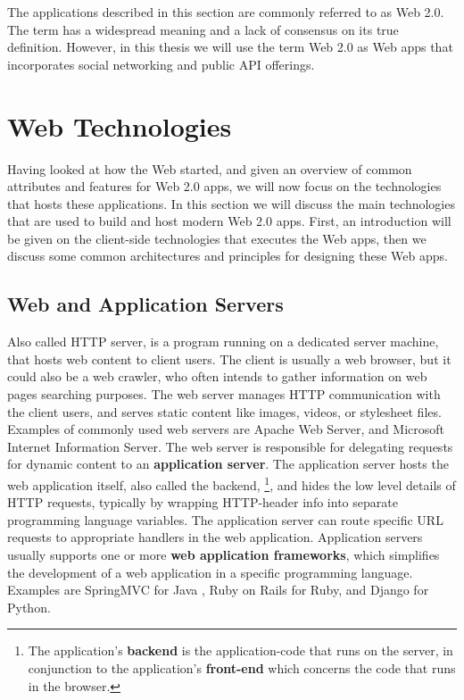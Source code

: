 The applications described in this section are commonly referred to as Web 2.0. \cite{web2.0} The term has a widespread meaning and a lack of consensus on its true definition. However, in this thesis we will use the term Web 2.0 as Web apps that incorporates social networking and public API offerings.

\section{Web Technologies}
Having looked at how the Web started, and given an overview of common attributes and features for Web 2.0 apps, we will now focus on the technologies that hosts these applications. In this section we will discuss the main technologies that are used to build and host modern Web 2.0 apps. First, an introduction will be given on the client-side technologies that executes the Web apps, then we discuss some common architectures and principles for designing these Web apps.

\subsection{Web and Application Servers}
Also called HTTP server, is a program running on a dedicated server machine, that hosts web content to client users. The client is usually a web browser, but it could also be a web crawler, who often intends to gather information on web pages searching purposes. The web server manages  HTTP communication with the client users, and serves static content like images, videos, or stylesheet files. Examples of commonly used web servers are Apache Web Server,\cite{apache} and Microsoft Internet Information Server.\cite{iis} The web server is responsible for delegating requests for dynamic content to an \textbf{application server}. The application server hosts the web application itself, also called the backend, \footnote{The application's \textbf{backend} is the application-code that runs on the server, in conjunction to the application's \textbf{front-end} which concerns the code that runs in the browser.}, and hides the low level details of HTTP requests, typically by wrapping HTTP-header info into separate programming language variables. The application server can route specific URL requests to appropriate handlers in the web application.  Application servers usually supports one or more \textbf{web application frameworks}, which simplifies the development of a web application in a specific programming language. Examples are SpringMVC for Java \cite{expertsOneToOne}, Ruby on Rails for Ruby,\cite{rails} and Django for Python.\cite{django} 

